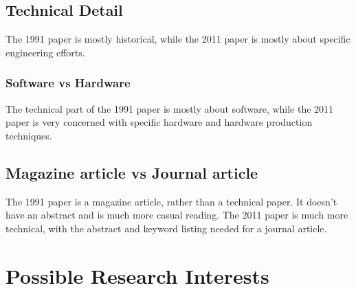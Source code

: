 \documentclass[conference]{IEEEtran}
\begin{document}
\subsection{Technical Detail}
The 1991 paper is mostly historical, while the 2011 paper is mostly about
specific engineering efforts.

\subsubsection{Software vs Hardware}
The technical part of the 1991 paper is mostly about software,
while the 2011 paper is very concerned with specific hardware and
hardware production techniques.

\subsection{Magazine article vs Journal article}
The 1991 paper is a magazine article, rather than a technical paper.
It doesn't have an abstract and is much more casual reading.  The 2011 paper
is much more technical, with the abstract and keyword listing needed for a
journal article.

\section{Possible Research Interests}
\end{document}
